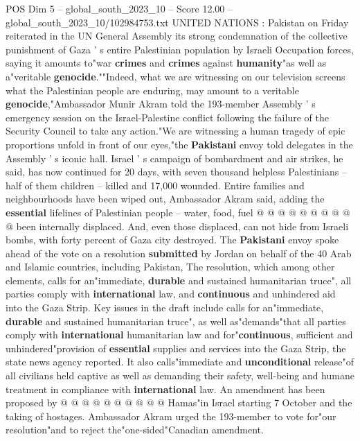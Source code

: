 \begin{textsample}{POS Dim 5 – global\_south\_2023\_10 – Score 12.00 – global\_south\_2023\_10/102984753.txt}  \label{ex:f5_pos_389}
UNITED NATIONS : Pakistan on Friday reiterated in the UN General Assembly its strong condemnation of the collective punishment of Gaza ' s entire Palestinian population by Israeli Occupation forces, saying it amounts to"war \textbf{crimes} and \textbf{crimes} against \textbf{humanity}"as well as a"veritable \textbf{genocide}.""Indeed, what we are witnessing on our television screens what the Palestinian people are enduring, may amount to a veritable \textbf{genocide},"Ambassador Munir Akram told the 193-member Assembly ' s emergency session on the Israel-Palestine conflict following the failure of the Security Council to take any action."We are witnessing a human tragedy of epic proportions unfold in front of our eyes,"the \textbf{Pakistani} envoy told delegates in the Assembly ' s iconic hall.
Israel ' s campaign of bombardment and air strikes, he said, has now continued for 20 days, with seven thousand helpless Palestinians -- half of them children -- killed and 17,000 wounded.
Entire families and neighbourhoods have been wiped out, Ambassador Akram said, adding the \textbf{essential} lifelines of Palestinian people -- water, food, fuel @ @ @ @ @ @ @ @ @ @ been internally displaced.
And, even those displaced, can not hide from Israeli bombs, with forty percent of Gaza city destroyed.
The \textbf{Pakistani} envoy spoke ahead of the vote on a resolution \textbf{submitted} by Jordan on behalf of the 40 Arab and Islamic countries, including Pakistan, The resolution, which among other elements, calls for an"immediate, \textbf{durable} and sustained humanitarian truce", all parties comply with \textbf{international} law, and \textbf{continuous} and unhindered aid into the Gaza Strip.
Key issues in the draft include calls for an"immediate, \textbf{durable} and sustained humanitarian truce", as well as"demands"that all parties comply with \textbf{international} humanitarian law and for"\textbf{continuous}, sufficient and unhindered"provision of \textbf{essential} supplies and services into the Gaza Strip, the state news agency reported.
It also calls"immediate and \textbf{unconditional} release"of all civilians held captive as well as demanding their safety, well-being and humane treatment in compliance with \textbf{international} law.
An amendment has been proposed by @ @ @ @ @ @ @ @ @ @ Hamas"in Israel starting 7 October and the taking of hostages.
Ambassador Akram urged the 193-member to vote for"our resolution"and to reject the"one-sided"Canadian amendment.

\end{textsample}
